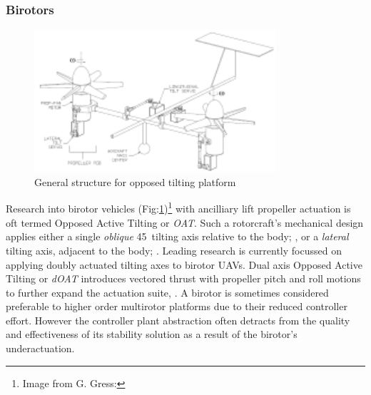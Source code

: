 \subsubsection*{Birotors}
\begin{figure}[hbtp]
\centering
\includegraphics[width=0.8\textwidth]{figs/dualaxistilt}
\caption{General structure for opposed tilting platform}
\label{fig:dualaxistilt}
\end{figure}
Research into birotor vehicles (Fig:\ref{fig:dualaxistilt})\footnote{Image from G. Gress:\cite{gres2007}} with ancilliary lift propeller actuation is oft termed Opposed Active Tilting or \emph{OAT}. Such a rotorcraft's mechanical design applies either a single \emph{oblique} 45\textdegree ~tilting axis relative to the body; \cite{smalltwotilting,obliquepitch,passiveobliquetilting}, or a \emph{lateral} tilting axis, adjacent to the body; \cite{tiltrotorUAV,adaptivebackstep,tiltrotorcontrol,tpheonix}. Leading research is currently focussed on applying doubly actuated tilting axes to birotor UAVs. Dual axis Opposed Active Tilting or \emph{dOAT} introduces vectored thrust with propeller pitch and roll motions to further expand the actuation suite, \cite{gres2007,opposedlateraldualaxis}. A birotor is sometimes considered preferable to higher order multirotor platforms due to their reduced controller effort. However the controller plant abstraction often detracts from the quality and effectiveness of its stability solution as a result of the birotor's underactuation. 
\par
